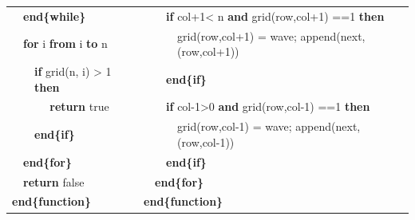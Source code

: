 \documentclass[11pt,a4paper,boxed]{caspset}
\begin{document}
\begin{itemize}
\begin{table}[!htb]
{\begin{tabular}{|lllllllll}
 & \multicolumn{4}{l|}{\textbf{end\{while\}}} &  &  & \multicolumn{2}{l|}{\textbf{if} col+1< n \textbf{and} grid(row,col+1) ==1 \textbf{then}} \\
 & \multicolumn{4}{l|}{\textbf{for} i \textbf{from} i \textbf{to} n} &  &  &  & \multicolumn{1}{l|}{grid(row,col+1) = wave; append(next, (row,col+1))} \\
 &  & \multicolumn{3}{l|}{\textbf{if} grid(n, i) > 1 \textbf{then}} &  &  & \multicolumn{2}{l|}{\textbf{end\{if\}}} \\
 &  &  & \multicolumn{2}{l|}{ \textbf{return} true} &  &  & \multicolumn{2}{l|}{\textbf{if} col-1>0 \textbf{and} grid(row,col-1) ==1 \textbf{then}} \\
 &  & \multicolumn{3}{l|}{\textbf{end\{if\}}} &  &  &  & \multicolumn{1}{l|}{grid(row,col-1) = wave; append(next, (row,col-1))} \\
 & \multicolumn{4}{l|}{\textbf{end\{for\}}} &  &  & \multicolumn{2}{l|}{\textbf{end\{if\}}} \\
 & \multicolumn{4}{l|}{\textbf{return} false} &  & \multicolumn{3}{l|}{\textbf{end\{for\}}} \\
\multicolumn{5}{|l|}{\textbf{end\{function\}}} & \multicolumn{4}{l|}{\textbf{end\{function\}}} \\
\hline
\end{tabular}
}
\end{table}


\end{itemize}
\end{document}
